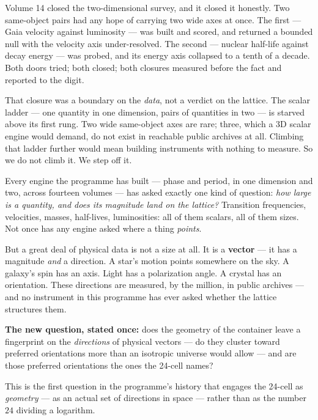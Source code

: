 \documentclass[11pt, letterpaper, openany]{book}
\begin{document}
Volume 14 closed the two-dimensional survey, and it closed it honestly. Two same-object pairs had
any hope of carrying two wide axes at once. The first --- Gaia velocity against luminosity --- was
built and scored, and returned a bounded null with the velocity axis under-resolved. The second ---
nuclear half-life against decay energy --- was probed, and its energy axis collapsed to a tenth of
a decade. Both doors tried; both closed; both closures measured before the fact and reported to the
digit.

\begin{signalbox}
That closure was a boundary on the \emph{data}, not a verdict on the lattice. The scalar ladder ---
one quantity in one dimension, pairs of quantities in two --- is starved above its first rung. Two
wide same-object axes are rare; three, which a 3D scalar engine would demand, do not exist in
reachable public archives at all. Climbing that ladder further would mean building instruments with
nothing to measure. So we do not climb it. We step off it.
\end{signalbox}

Every engine the programme has built --- phase and period, in one dimension and two, across fourteen
volumes --- has asked exactly one kind of question: \emph{how large is a quantity, and does its
magnitude land on the lattice?} Transition frequencies, velocities, masses, half-lives, luminosities:
all of them scalars, all of them sizes. Not once has any engine asked where a thing \emph{points}.

But a great deal of physical data is not a size at all. It is a \textbf{vector} --- it has a
magnitude \emph{and} a direction. A star's motion points somewhere on the sky. A galaxy's spin has an
axis. Light has a polarization angle. A crystal has an orientation. These directions are measured, by
the million, in public archives --- and no instrument in this programme has ever asked whether the
lattice structures them.

\begin{geobox}
\textbf{The new question, stated once:} does the geometry of the container leave a fingerprint on the
\emph{directions} of physical vectors --- do they cluster toward preferred orientations more than an
isotropic universe would allow --- and are those preferred orientations the ones the 24-cell names?

This is the first question in the programme's history that engages the 24-cell as \emph{geometry} ---
as an actual set of directions in space --- rather than as the number $24$ dividing a logarithm.
\end{geobox}
\end{document}
